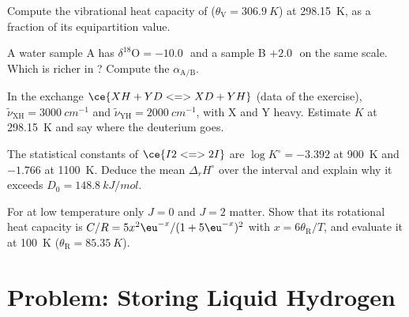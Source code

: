 \begin{exercise}[$\star\star$]\label{exo:b3:statistical-thermo-applied:8}
Compute the vibrational heat capacity of  ($\theta_{\mathrm V} = \qty{306.9}{K}$) at
\qty{298.15}{K}, as a fraction of its equipartition value.
\end{exercise}

\begin{exercise}[$\star\star$]\label{exo:b3:statistical-thermo-applied:9}
A water sample A has $\delta^{18}\mathrm O = -10.0$\,\textperthousand\ and a sample B
$+2.0$\,\textperthousand\ on the same scale. Which is richer in ? Compute the
 $\alpha_{\mathrm{A/B}}$.
\end{exercise}

\begin{exercise}[$\star\star\star$]\label{exo:b3:statistical-thermo-applied:10}
In the exchange $\ce{XH + YD <=> XD + YH}$ (data of the exercise), $\tilde\nu_{\mathrm{XH}} =
\qty{3000}{cm^{-1}}$ and $\tilde\nu_{\mathrm{YH}} = \qty{2000}{cm^{-1}}$, with X and Y heavy. Estimate $K$ at
\qty{298.15}{K} and say where the deuterium goes.
\end{exercise}

\begin{exercise}[$\star\star\star$]\label{exo:b3:statistical-thermo-applied:11}
The statistical constants of $\ce{I2 <=> 2 I}$ are $\log K^\circ = -3.392$ at \qty{900}{K} and
$-1.766$ at \qty{1100}{K}. Deduce the mean $\Delta_rH^\circ$ over the interval and explain
why it exceeds $D_0 = \qty{148.8}{kJ/mol}$.
\end{exercise}

\begin{exercise}[$\star\star\star$]\label{exo:b3:statistical-thermo-applied:12}
For  at low temperature only $J = 0$ and $J = 2$ matter. Show that
its rotational heat capacity is $C/R = 5x^2\eu^{-x}/(1 + 5\eu^{-x})^2$ with $x = 6\theta_{\mathrm R}/T$, and
evaluate it at \qty{100}{K} ($\theta_{\mathrm R} = \qty{85.35}{K}$).
\end{exercise}

\section{Problem: Storing Liquid Hydrogen}

